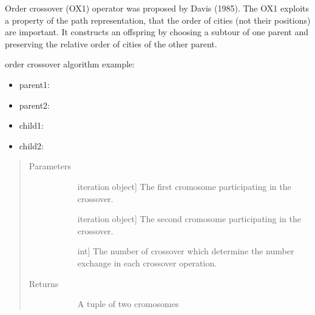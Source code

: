 \documentclass[letterpaper,10pt,english]{sphinxmanual}
\begin{document}
\begin{fulllineitems}
\label{\detokenize{pygace:pygace.ga.order_crossover}}
Order crossover (OX1) operator was proposed by Davis (1985). The OX1 exploits
a property of the path representation, that the order of cities (not their
positions) are important. It constructs an offspring by choosing a subtour
of one parent and preserving the relative order of cities of the other
parent.

order crossover algorithm example:
\begin{itemize}
\item {} 
parent1: 

\item {} 
parent2: 

\item {} 
child1: 

\item {} 
child2: 

\end{itemize}
\begin{quote}\begin{description}
\item[{Parameters}] \leavevmode\begin{description}
\item[{}] \leavevmode{[}iteration object{]}
The first cromosome participating in the crossover.

\item[{}] \leavevmode{[}iteration object{]}
The second cromosome participating in the crossover.

\item[{}] \leavevmode{[}int{]}
The number of crossover which determine the number exchange in each
crossover operation.

\end{description}

\item[{Returns}] \leavevmode\begin{description}
\item[{}] \leavevmode
A tuple of two cromosomes


\end{description}
\end{description}
\end{quote}
\end{fulllineitems}
\end{document}
